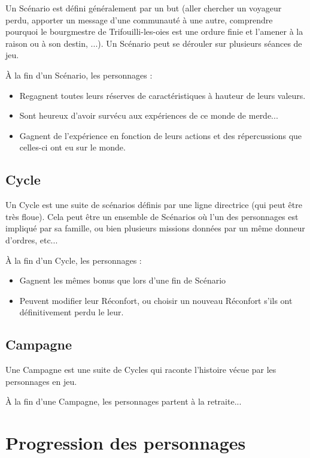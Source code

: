 \documentclass[a4paper,10pt,twoside,twocolumn,openany,bg=print,justified]{dndbook}
\begin{document}
Un Scénario est défini généralement par un but (aller chercher un voyageur perdu, apporter un message d'une communauté à une autre, comprendre pourquoi le bourgmestre de Trifouilli-les-oies est une ordure finie et l'amener à la raison ou à son destin, ...). Un Scénario peut se dérouler sur plusieurs séances de jeu.

À la fin d'un Scénario, les personnages :

\begin{itemize}
	\item Regagnent toutes leurs réserves de caractéristiques à hauteur de leurs valeurs.
	\item Sont heureux d'avoir survécu aux expériences de ce monde de merde...
	\item Gagnent de l'expérience en fonction de leurs actions et des répercussions que celles-ci ont eu sur le monde.
\end{itemize}

\subsection*{Cycle}

Un Cycle est une suite de scénarios définis par une ligne directrice (qui peut être très floue). Cela peut être un ensemble de Scénarios où l'un des personnages est impliqué par sa famille, ou bien plusieurs missions données par un même donneur d'ordres, etc...

À la fin d'un Cycle, les personnages :

\begin{itemize}
	\item Gagnent les mêmes bonus que lors d'une fin de Scénario
	\item Peuvent modifier leur Réconfort, ou choisir un nouveau Réconfort s'ils ont définitivement perdu le leur.
\end{itemize}

\subsection*{Campagne}

Une Campagne est une suite de Cycles qui raconte l'histoire vécue par les personnages en jeu.

À la fin d'une Campagne, les personnages partent à la retraite...

\section{Progression des personnages}
\end{document}
